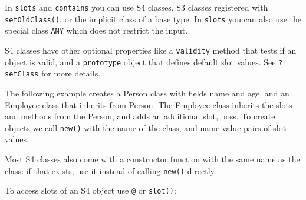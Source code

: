 In \texttt{slots} and \texttt{contains} you can use S4 classes, S3
classes registered with \texttt{setOldClass()}, or the implicit class of
a base type. In \texttt{slots} you can also use the special class
\texttt{ANY} which does not restrict the input.

S4 classes have other optional properties like a \texttt{validity}
method that tests if an object is valid, and a \texttt{prototype} object
that defines default slot values. See \texttt{?setClass} for more
details.

The following example creates a Person class with fields name and age,
and an Employee class that inherits from Person. The Employee class
inherits the slots and methods from the Person, and adds an additional
slot, boss. To create objects we call \texttt{new()} with the name of
the class, and name-value pairs of slot values. 

\begin{Shaded}
\begin{Highlighting}[]
\NormalTok{(}\NormalTok{,}
   \NormalTok{(} \NormalTok{, } \NormalTok{))}
\NormalTok{(}\NormalTok{,}
   \NormalTok{(} \NormalTok{),}
   \NormalTok{)}

\StringTok{ }\NormalTok{(}\NormalTok{, } \NormalTok{, } \NormalTok{)}
\StringTok{ }\NormalTok{(}\NormalTok{, } \NormalTok{, } \NormalTok{, } 
\end{Highlighting}
\end{Shaded}

Most S4 classes also come with a constructor function with the same name
as the class: if that exists, use it instead of calling \texttt{new()}
directly.

To access slots of an S4 object use \texttt{@} or \texttt{slot()}:
 

\begin{Shaded}
\begin{Highlighting}[]
\NormalTok{)}
\CommentTok{#> }
\end{Highlighting}
\end{Shaded}

